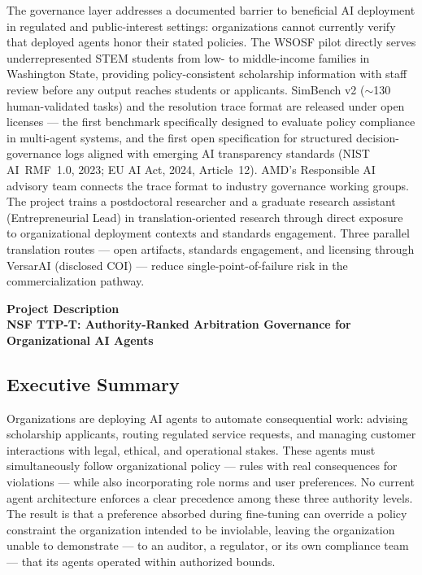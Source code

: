 \documentclass[11pt]{article}
\newcommand{\nsftitle}{NSF TTP-T: Authority-Ranked Arbitration Governance for Organizational AI Agents}
\begin{document}
The governance layer addresses a documented barrier to beneficial AI deployment in regulated and public-interest settings: organizations cannot currently verify that deployed agents honor their stated policies. The WSOSF pilot directly serves underrepresented STEM students from low- to middle-income families in Washington State, providing policy-consistent scholarship information with staff review before any output reaches students or applicants. SimBench v2 ($\sim$130 human-validated tasks) and the resolution trace format are released under open licenses --- the first benchmark specifically designed to evaluate policy compliance in multi-agent systems, and the first open specification for structured decision-governance logs aligned with emerging AI transparency standards (NIST AI~RMF~1.0, 2023; EU AI Act, 2024, Article~12). AMD's Responsible AI advisory team connects the trace format to industry governance working groups. The project trains a postdoctoral researcher and a graduate research assistant (Entrepreneurial Lead) in translation-oriented research through direct exposure to organizational deployment contexts and standards engagement. Three parallel translation routes --- open artifacts, standards engagement, and licensing through VersarAI (disclosed COI) --- reduce single-point-of-failure risk in the commercialization pathway.

\clearpage


\begin{center}
  {\large\bfseries Project Description}\\[4pt]
  {\normalsize\bfseries \nsftitle}
\end{center}

\subsection*{Executive Summary}

Organizations are deploying AI agents to automate consequential work: advising scholarship applicants, routing regulated service requests, and managing customer interactions with legal, ethical, and operational stakes. These agents must simultaneously follow organizational policy --- rules with real consequences for violations --- while also incorporating role norms and user preferences. No current agent architecture enforces a clear precedence among these three authority levels. The result is that a preference absorbed during fine-tuning can override a policy constraint the organization intended to be inviolable, leaving the organization unable to demonstrate --- to an auditor, a regulator, or its own compliance team --- that its agents operated within authorized bounds.
\end{document}
